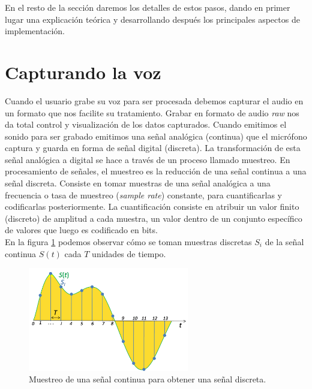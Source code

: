 En el resto de la sección daremos los detalles de estos pasos, dando en primer lugar una explicación teórica y desarrollando después los principales aspectos de implementación.


\section{Capturando la voz}

Cuando el usuario grabe su voz para ser procesada debemos capturar el audio en un formato que nos facilite su tratamiento. Grabar en formato de audio \emph{raw} nos da total control y visualización de los datos capturados.
Cuando emitimos el sonido para ser grabado emitimos una señal analógica (continua) que el micrófono captura y guarda en forma de señal digital (discreta). 
La transformación de esta señal analógica a digital se hace a través de un proceso llamado muestreo.
En procesamiento de señales, el muestreo es la reducción de una señal continua a una señal discreta. Consiste en tomar muestras de una señal analógica a una frecuencia o tasa de muestreo (\emph{sample rate}) constante, para cuantificarlas y codificarlas posteriormente. La cuantificación consiste en atribuir un valor finito (discreto) de amplitud a cada muestra, un valor dentro de un conjunto específico de valores que luego es codificado en bits.\\

En la figura \ref{fig:sampling} podemos observar cómo se toman muestras discretas $S_i$ de la señal continua $S(t)$ cada $T$ unidades de tiempo.

\begin{figure}[th]
\centering
\includegraphics[width=7cm]{Figures/Signal_Sampling}
\decoRule
\caption[Muestreo]{Muestreo de una señal continua para obtener una señal discreta.}
\label{fig:sampling}
\end{figure}

